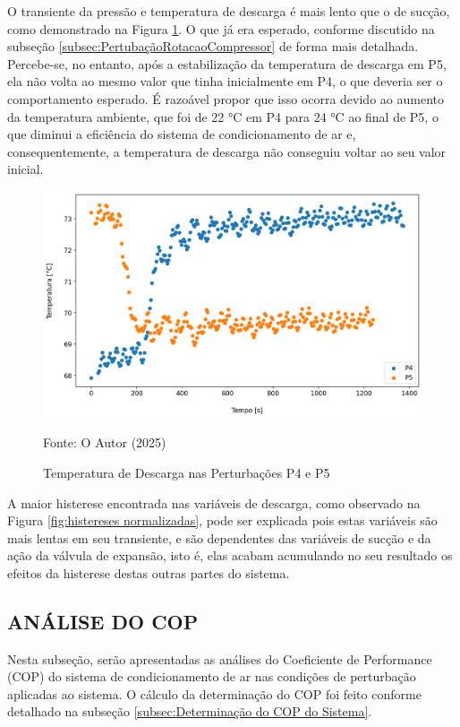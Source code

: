 O transiente da pressão e temperatura de descarga é mais lento que o de sucção, como demonstrado na Figura \ref{fig:TempDescargaSubidaeDescida}. O que já era esperado, conforme discutido na subseção \ref{subsec:PertubaçãoRotacaoCompressor} de forma mais detalhada.
Percebe-se, no entanto, após a estabilização da temperatura de descarga em P5, ela não volta ao mesmo valor que tinha inicialmente em P4, o que deveria ser o comportamento esperado. É razoável propor que isso ocorra devido ao aumento da temperatura ambiente, que foi de 22 °C em P4 para 24 °C ao final de P5, o que diminui a eficiência do sistema de condicionamento de ar e, consequentemente, a temperatura de descarga não conseguiu voltar ao seu valor inicial.
\newpage
\begin{figure}[h]
    \centering
    \includegraphics[width=1\linewidth]{FigurasdoTexto/Temperatura de Descarga.png}
    \caption{Temperatura de Descarga  nas Perturbações P4 e P5}
    \label{fig:TempDescargaSubidaeDescida}
    {\footnotesize Fonte: O Autor (2025)}
\end{figure}

A maior histerese encontrada nas variáveis de descarga, como observado na Figura \ref{fig:histereses normalizadas}, pode ser explicada pois estas variáveis são mais lentas em seu transiente, e são dependentes das variáveis de sucção e da ação da válvula de expansão, isto é, elas acabam acumulando no seu resultado os efeitos da histerese destas outras partes do sistema. 

\subsection{\MakeUppercase{Análise do COP}}

Nesta subseção, serão apresentadas as análises do Coeficiente de Performance (COP) do sistema de condicionamento de ar nas condições de perturbação aplicadas ao sistema. O cálculo da determinação do COP foi feito conforme detalhado na subseção \ref{subsec:Determinação do COP do Sistema}.

